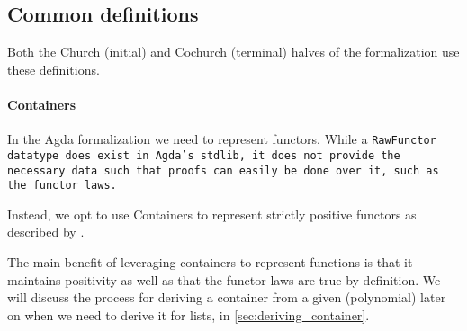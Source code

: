 \subsection{Common definitions}
Both the Church (initial) and Cochurch (terminal) halves of the formalization use these definitions.


\paragraph{Containers}
In the Agda formalization we need to represent functors.
While a \tt{RawFunctor} datatype does exist in Agda's stdlib, it does not provide the necessary data such that proofs can easily be done over it, such as the functor laws.

Instead, we opt to use Containers to represent strictly positive functors as described by \cite{Abbott2005}.


The main benefit of leveraging containers to represent functions is that it maintains positivity as well as that the functor laws are true by definition.
We will discuss the process for deriving a container from a given (polynomial) later on when we need to derive it for lists, in \autoref{sec:deriving_container}.


